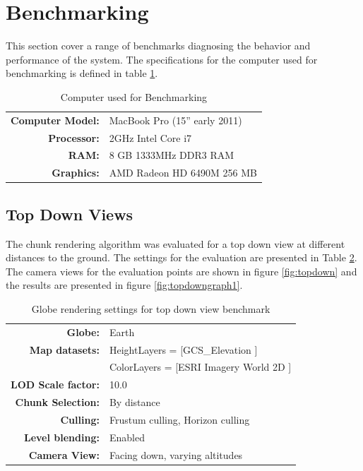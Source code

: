 \clearpage
\section{Benchmarking}
\label{section:benchmarking}
\FloatBarrier
This section cover a range of benchmarks diagnosing the behavior and performance of the system. The specifications for the computer used for benchmarking is defined in table \ref{table:benchmark host}. 

\begin{table}[h]
  \centering
  \caption[]{Computer used for Benchmarking}
    \label{table:benchmark host}
  \begin{tabular}{| r l |}
    \hline
      \textbf{Computer Model:}  & MacBook Pro (15'' early 2011) \\
      \textbf{Processor:}       & 2GHz Intel Core i7 \\
      \textbf{RAM:}             & 8 GB 1333MHz DDR3 RAM \\
      \textbf{Graphics:}        & AMD Radeon HD 6490M 256 MB \\
    \hline
  \end{tabular}
\end{table}



\clearpage
\subsection{Top Down Views}
\FloatBarrier
The chunk rendering algorithm was evaluated for a top down view at different distances to the ground. The settings for the evaluation are presented in Table \ref{table:settingstopdown}. The camera views for the evaluation points are shown in figure \ref{fig:topdown} and the results are presented in figure \ref{fig:topdowngraph1}.
\begin{table}[h]
  \centering
  \caption[]{Globe rendering settings for top down view benchmark}
    \label{table:settingstopdown}
  \begin{tabular}{| r l |}
    \hline
      \textbf{Globe:}             & Earth \\
      \textbf{Map datasets:}      & HeightLayers = [GCS\_Elevation \cite{worldelevation3d}] \\
                                  & ColorLayers = [ESRI Imagery World 2D \cite{imageryworld2d}] \\
      \textbf{LOD Scale factor:}  & 10.0 \\
      \textbf{Chunk Selection:}    & By distance \\
      \textbf{Culling:}           & Frustum culling, Horizon culling \\
      \textbf{Level blending:}    & Enabled \\
      \textbf{Camera View:}       & Facing down, varying altitudes\\
    \hline
  \end{tabular}
\end{table}

